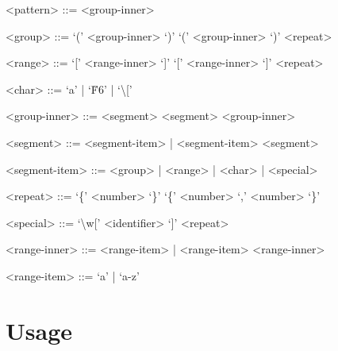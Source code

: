 \documentclass[a4paper,twocolumn]{article}
\begin{document}
\setlength{\grammarindent}{4em}
\begin{grammar}

<pattern> ::= <group-inner>

<group> ::= ‘(’ <group-inner> ‘)’ \alt ‘(’ <group-inner> ‘)’ <repeat>

<range> ::= ‘[’ <range-inner> ‘]’ \alt ‘[’ <range-inner> ‘]’ <repeat>

<char> ::= ‘a’ | ‘\u{F6}’ | ‘\textbackslash [’

<group-inner> ::= <segment> \alt <segment> <group-inner>

<segment> ::= <segment-item> | <segment-item> <segment>

<segment-item> ::= <group> | <range> | <char> | <special>

<repeat> ::= ‘\{’ <number> ‘\}’ \alt ‘\{’ <number> ‘,’ <number> ‘\}’

<special> ::= ‘\textbackslash w[’ <identifier> ‘]’ <repeat>

<range-inner> ::= <range-item> | <range-item> <range-inner>

<range-item> ::= ‘a’ | ‘a-z’

\end{grammar}

\section{Usage}

\printbibliography
\end{document}
